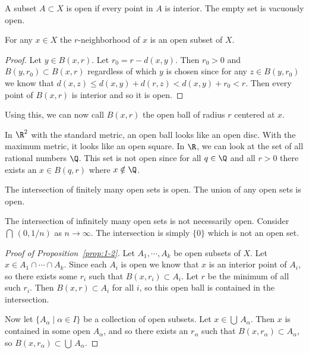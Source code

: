 \begin{definition}
A subset $A \subset X$ is open if every point in $A$ is interior. The empty set is vacuously open.
\end{definition}

\begin{proposition}
For any $x \in X$ the $r$-neighborhood of $x$ is an open subset of $X$.
\end{proposition}

\begin{proof}
Let $y \in B(x,r)$. Let $r_0 = r - d(x,y)$. Then $r_0 > 0$ and $B(y,r_0) \subset B(x,r)$ regardless of which $y$ is chosen since for any $z \in B(y,r_0)$ we know that $d(x,z) \leq d(x,y) + d(r,z) < d(x,y) + r_0 < r$. Then every point of $B(x,r)$ is interior and so it is open.
\end{proof}

Using this, we can now call $B(x,r)$ the open ball of radius $r$ centered at $x$.

\begin{example}
In $\R^2$ with the standard metric, an open ball looks like an open disc. With the maximum metric, it looks like an open square. In $\R$, we can look at the set of all rational numbers $\Q$. This set is not open since for all $q \in \Q$ and all $r > 0$ there exists an $x \in B(q,r)$ where $x \notin \Q$.
\end{example}

\begin{proposition}\label{prop:1-2}
The intersection of finitely many open sets is open. The union of any open sets is open.
\end{proposition}

\begin{example}
The intersection of infinitely many open sets is not necessarily open. Consider $\bigcap\, (0,1/n)$ as $n \to \infty$. The intersection is simply $\{0\}$ which is not an open set.
\end{example}

\begin{proof}[Proof of Proposition~\ref{prop:1-2}]
Let $A_1, \cdots, A_k$ be open subsets of $X$. Let $x \in A_1 \cap \cdots \cap A_k$. Since each $A_i$ is open we know that $x$ is an interior point of $A_i$, so there exists some $r_i$ such that $B(x,r_i) \subset A_i$. Let $r$ be the minimum of all such $r_i$. Then $B(x,r) \subset A_i$ for all $i$, so this open ball is contained in the intersection.

Now let $\{A_\alpha \mid \alpha \in I \}$ be a collection of open subsets. Let $x \in \bigcup\,A_\alpha$. Then $x$ is contained in some open $A_\alpha$, and so there exists an $r_\alpha$ such that $B(x,r_\alpha) \subset A_\alpha$, so $B(x,r_\alpha) \subset \bigcup\,A_\alpha$.
\end{proof}

